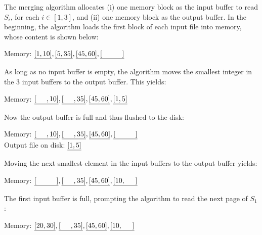 \begin{sol}
 The merging algorithm allocates (i) one memory block as the input buffer to read $S_i$, for each $i \in [1, 3]$, and (ii) one memory block as the output buffer. In the beginning, the algorithm loads the first block of each input file into memory, whose content is shown below:

\begin{center}
    Memory: $\uline{[1, 10]}, \uline{[5, 35]}, \uline{[45, 60]}, \uline{[\hspace{10mm}]}$
\end{center}

\noindent As long as no input buffer is empty, the algorithm moves the smallest integer in the 3 input buffers to the output buffer. This yields:

\begin{center}
    Memory: $\uline{[\hspace{5mm}, 10]}, \uline{[\hspace{5mm}, 35]}, \uline{[45, 60]}, \uline{[1, 5]}$
\end{center}

\noindent Now the output buffer is full and thus flushed to the disk:

\begin{center}
    Memory: $\uline{[\hspace{5mm}, 10]}, \uline{[\hspace{5mm}, 35]}, \uline{[45, 60]}, \uline{[\hspace{10mm}]}$ \\
    Output file on disk: $\uline{[1, 5]}$ \\
\end{center}

\noindent Moving the next smallest element in the input buffers to the output buffer yields:

\begin{center}
    Memory: $\uline{[\hspace{10mm}]}, \uline{[\hspace{5mm}, 35]}, \uline{[45, 60]}, \uline{[10, \hspace{5mm}]}$
\end{center}

\noindent The first input buffer is full, prompting the algorithm to read the next page of $S_1$:

\begin{center}
    Memory: $\uline{[20, 30]}, \uline{[\hspace{5mm}, 35]}, \uline{[45, 60]}, \uline{[10, \hspace{5mm}]}$
\end{center}


\end{sol}
